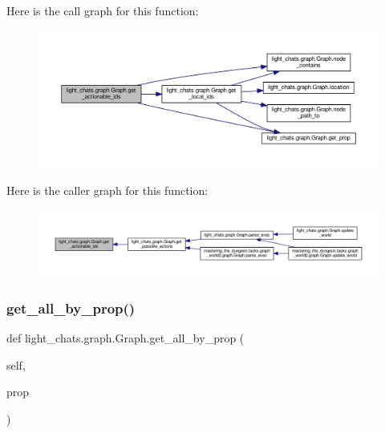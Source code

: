 Here is the call graph for this function\+:
\nopagebreak
\begin{figure}[H]
\begin{center}
\leavevmode
\includegraphics[width=350pt]{classlight__chats_1_1graph_1_1Graph_a04cea64dfded92bfd69055e184aa390d_cgraph}
\end{center}
\end{figure}
Here is the caller graph for this function\+:
\nopagebreak
\begin{figure}[H]
\begin{center}
\leavevmode
\includegraphics[width=350pt]{classlight__chats_1_1graph_1_1Graph_a04cea64dfded92bfd69055e184aa390d_icgraph}
\end{center}
\end{figure}
\mbox{\label{classlight__chats_1_1graph_1_1Graph_a4d86c4e411c724a8e169060335314d90}} 
\subsubsection{\texorpdfstring{get\+\_\+all\+\_\+by\+\_\+prop()}{get\_all\_by\_prop()}}
{\footnotesize\ttfamily def light\+\_\+chats.\+graph.\+Graph.\+get\+\_\+all\+\_\+by\+\_\+prop (\begin{DoxyParamCaption}\item[{}]{self,  }\item[{}]{prop }\end{DoxyParamCaption})}



